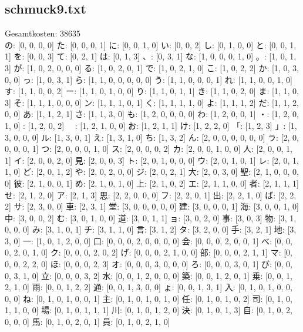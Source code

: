 \documentclass[a4paper,10pt,ngerman]{scrartcl}
\begin{document}
\subsection{schmuck9.txt}
Gesamtkosten: 38635\\
の: [0, 0, 0, 0]
た: [0, 0, 0, 1]
に: [0, 0, 1, 0]
い: [0, 0, 2]
し: [0, 1, 0, 0]
と: [0, 0, 1, 1]
を: [0, 0, 3]
て: [0, 2, 1]
は: [0, 1, 3]
、: [0, 3, 1]
な: [1, 0, 0, 0, 1, 0]
。: [1, 0, 1, 3]
が: [1, 0, 2, 0, 0, 0]
る: [1, 0, 2, 0, 1]
で: [1, 0, 2, 1, 0]
こ: [1, 0, 2, 2]
か: [1, 0, 3, 0, 0]
っ: [1, 0, 3, 1]
ら: [1, 1, 0, 0, 0, 0, 0]
う: [1, 1, 0, 0, 0, 1]
れ: [1, 1, 0, 0, 1, 0]
す: [1, 1, 0, 0, 2]
ー: [1, 1, 0, 1, 0, 0]
り: [1, 1, 0, 1, 1]
き: [1, 1, 0, 2, 0]
ま: [1, 1, 0, 3]
そ: [1, 1, 1, 0, 0, 0]
ン: [1, 1, 1, 0, 1]
く: [1, 1, 1, 1, 0]
よ: [1, 1, 1, 2]
だ: [1, 1, 2, 0, 0]
あ: [1, 1, 2, 1]
さ: [1, 1, 3, 0]
も: [1, 2, 0, 0, 0, 0]
わ: [1, 2, 0, 0, 1]
・: [1, 2, 0, 1, 0]
 : [1, 2, 0, 2]
　: [1, 2, 1, 0, 0]
お: [1, 2, 1, 1]
け: [1, 2, 2, 0]
「: [1, 2, 3]
」: [1, 3, 0, 0, 0]
ル: [1, 3, 0, 1]
え: [1, 3, 1, 0]
ち: [1, 3, 2]
ん: [2, 0, 0, 0, 0, 0, 0]
ラ: [2, 0, 0, 0, 0, 1]
つ: [2, 0, 0, 0, 1, 0]
ス: [2, 0, 0, 0, 2]
カ: [2, 0, 0, 1, 0, 0]
人: [2, 0, 0, 1, 1]
イ: [2, 0, 0, 2, 0]
見: [2, 0, 0, 3]
ト: [2, 0, 1, 0, 0, 0]
ウ: [2, 0, 1, 0, 1]
レ: [2, 0, 1, 1, 0]
ど: [2, 0, 1, 2]
や: [2, 0, 2, 0, 0]
ジ: [2, 0, 2, 1]
大: [2, 0, 3, 0]
聖: [2, 1, 0, 0, 0, 0]
彼: [2, 1, 0, 0, 1]
め: [2, 1, 0, 1, 0]
上: [2, 1, 0, 2]
エ: [2, 1, 1, 0, 0]
者: [2, 1, 1, 1]
せ: [2, 1, 2, 0]
ア: [2, 1, 3]
思: [2, 2, 0, 0, 0]
フ: [2, 2, 0, 1]
出: [2, 2, 1, 0]
ば: [2, 2, 2]
サ: [2, 3, 0, 0]
車: [2, 3, 1]
堂: [3, 0, 0, 0, 0, 0]
建: [3, 0, 0, 0, 1]
海: [3, 0, 0, 1, 0]
中: [3, 0, 0, 2]
む: [3, 0, 1, 0, 0]
道: [3, 0, 1, 1]
ョ: [3, 0, 2, 0]
事: [3, 0, 3]
物: [3, 1, 0, 0, 0]
み: [3, 1, 0, 1]
チ: [3, 1, 1, 0]
言: [3, 1, 2]
タ: [3, 2, 0, 0]
手: [3, 2, 1]
地: [3, 3, 0]
一: [1, 0, 1, 2, 0, 0]
口: [0, 0, 0, 2, 0, 0, 0, 0]
会: [0, 0, 0, 2, 0, 0, 1]
べ: [0, 0, 0, 2, 0, 1, 0]
ク: [0, 0, 0, 2, 0, 2]
げ: [0, 0, 0, 2, 1, 0, 0]
部: [0, 0, 0, 2, 1, 1]
マ: [0, 0, 0, 2, 2, 0]
ほ: [0, 0, 0, 2, 3]
オ: [0, 0, 0, 3, 0, 0, 0]
ろ: [0, 0, 0, 3, 0, 1]
び: [0, 0, 0, 3, 1, 0]
立: [0, 0, 0, 3, 2]
水: [0, 0, 1, 2, 0, 0, 0]
築: [0, 0, 1, 2, 0, 1]
乗: [0, 0, 1, 2, 1, 0]
雨: [0, 0, 1, 2, 2]
通: [0, 0, 1, 3, 0, 0]
ょ: [0, 0, 1, 3, 1]
入: [0, 1, 0, 1, 0, 0, 0, 0]
ね: [0, 1, 0, 1, 0, 0, 1]
主: [0, 1, 0, 1, 0, 1, 0]
任: [0, 1, 0, 1, 0, 2]
司: [0, 1, 0, 1, 1, 0, 0]
場: [0, 1, 0, 1, 1, 1]
川: [0, 1, 0, 1, 2, 0]
決: [0, 1, 0, 1, 3]
自: [0, 1, 0, 2, 0, 0, 0]
馬: [0, 1, 0, 2, 0, 1]
員: [0, 1, 0, 2, 1, 0]
\end{document}
